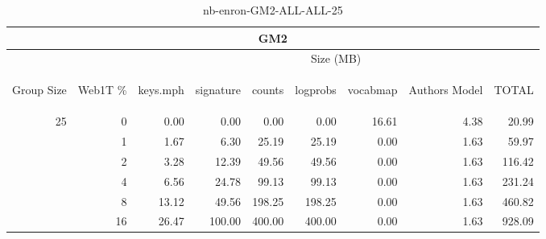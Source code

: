 \begin{center}
\begin{table}[htbp]
\begin{tabular}{ | r | r | r | r | r | r | r | r | r |}
\hline
\multicolumn{9}{|c|}{GM2}\\
\hline
 & & \multicolumn{7}{|c|}{Size (MB)}\\ \cline{3-9}
\begin{sideways}Group Size\end{sideways} & \begin{sideways}Web1T \% \end{sideways} & \begin{sideways}keys.mph\end{sideways} & \begin{sideways}signature\end{sideways} & \begin{sideways}counts\end{sideways} & \begin{sideways}logprobs\end{sideways} & \begin{sideways}vocabmap\end{sideways} & \begin{sideways}Authors Model \end{sideways} & \begin{sideways}TOTAL\end{sideways}\\
\hline
\multirow{5}{*}{25}
 & 0 & 0.00 & 0.00 & 0.00 & 0.00 & 16.61 & 4.38 & 20.99\\ \cline{2-9}
 & 1 & 1.67 & 6.30 & 25.19 & 25.19 & 0.00 & 1.63 & 59.97\\ \cline{2-9}
 & 2 & 3.28 & 12.39 & 49.56 & 49.56 & 0.00 & 1.63 & 116.42\\ \cline{2-9}
 & 4 & 6.56 & 24.78 & 99.13 & 99.13 & 0.00 & 1.63 & 231.24\\ \cline{2-9}
 & 8 & 13.12 & 49.56 & 198.25 & 198.25 & 0.00 & 1.63 & 460.82\\ \cline{2-9}
 & 16 & 26.47 & 100.00 & 400.00 & 400.00 & 0.00 & 1.63 & 928.09\\ \cline{2-9}
\hline
\end{tabular}
\caption{nb-enron-GM2-ALL-ALL-25}
\label{table:nb-enron-GM2-ALL-ALL-25}
\end{table}
\end{center}

